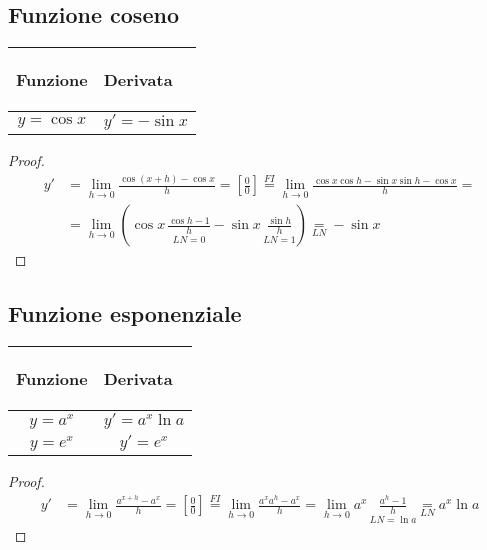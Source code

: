 \subsection{Funzione coseno}
\begin{center}
    \begin{tabular}{m{}|m{}}
        \begin{center}
            \textbf{Funzione}
        \end{center}
        & 
        \begin{center}
            \textbf{Derivata}
        \end{center}\\
        \hline
            \[y=\cos x\]&
            \[y'=- \sin x\]
    \end{tabular}
\end{center}
\begin{proof}
    \[\begin{aligned}y'&=\lim_{h\to 0}\frac{\cos(x+h)-\cos x}{h}=\left[ \frac{0}{0} \right]\overset{FI}{=}\lim_{h\to 0}\frac{\cos x \cos h - \sin x \sin h - \cos x}{h}=\\&=\lim_{h\to 0}\left(\cos x\,\underset{LN=0}{\boxed{\frac{\cos h-1}{h}}}-\sin x\,\underset{LN=1}{\boxed{\frac{\sin h}{h}}}\right)\underset{LN}=-\sin x\end{aligned}\]
\end{proof}

\subsection{Funzione esponenziale}
\begin{center}
    \begin{tabular}{m{}|m{}}
        \begin{center}
            \textbf{Funzione}
        \end{center}
        & 
        \begin{center}
            \textbf{Derivata}
        \end{center}\\
        \hline
            \[y=a^x\]&
            \[y'=a^x\ln a\] \\
            \[y=e^x\] & 
            \[y'=e^x\]
    \end{tabular}
\end{center}
\begin{proof}
    \[\begin{aligned}y'&=\lim_{h\to 0}\frac{a^{x+h}-a^x}{h}=\left[ \frac{0}{0} \right]\overset{FI}{=}\lim_{h\to 0}\frac{a^xa^h-a^x}{h}=\lim_{h\to 0}a^x\,\underset{LN=\ln a}{\boxed{\frac{a^h-1}{h}}}\underset{LN}=a^x\ln a\end{aligned}\]
\end{proof}

